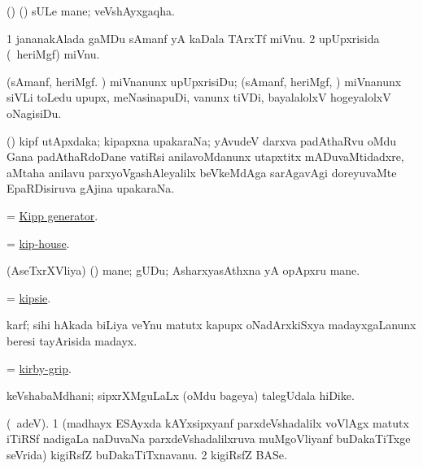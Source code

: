 \bentry
{}
\gl{\nA}
\bmng
(\birx) (\ashi) sULe mane; veVshAyxgaqha. 
\emng
\eentry

\bentry
{}
\gl{\nA}
\bmng
\bnum
\num{1} jananakAlada gaMDu sAmanf yA kaDala TArxTf miVnu. 
\num{2} upUpxrisida (\kanmu\ heriMgf) miVnu. 
\enum
\emng
\eentry

\bentry
{}
\gl{\sakirx}
\bmng
(sAmanf, heriMgf. \mo) miVnanunx upUpxrisiDu; (sAmanf, heriMgf, \mo) miVnanunx siVLi toLedu upupx, meNasinapuDi, \mo vanunx tiVDi, bayalalolxV hogeyalolxV oNagisiDu. 
\emng
\eentry


\bentry
{}
\gl{\nA}
\bmng
(\ravi) kipf utApxdaka; kipapxna upakaraNa; yAvudeV darxva padAthaRvu oMdu Gana padAthaRdoDane vatiRsi anilavoMdanunx utapxtitx mADuvaMtidadxre, aMtaha anilavu parxyoVgashAleyalilx beVkeMdAga sarAgavAgi doreyuvaMte EpaRDisiruva gAjina upakaraNa.  
\emng
\eentry

\bentry
{}
\gl{\nA}
\bmng
 = \hyperlink{Kipp generator}{Kipp generator}. 
\emng
\eentry

\bentry
{}
\gl{\nA}
\bmng
 = \hyperlink{kip-house}{kip-house}. 
\emng
\eentry

\bentry
{}
\gl{\nA}
\bmng
(AseTxrXVliya) (\ashi) mane; gUDu; AsharxyasAthxna yA opApxru mane. 
\emng
\eentry

\bentry
{}
\gl{\nA}
\bmng
 = \hyperlink{Kipsie}{kipsie}. 
\emng
\eentry

\bentry
{}
\gl{\nA}
\bmng
karf; sihi hAkada biLiya veYnu matutx kapupx oNadArxkiSxya madayxgaLanunx beresi tayArisida madayx. 
\emng
\eentry

\bentry
{}
\gl{\nA}
\expl{\P}
\bmng
 = \hyperlink{kirby-grip}{kirby-grip}. 
\emng
\eentry

\bentry
{}
\gl{\nA}
\bmng
keVshabaMdhani; sipxrXMguLaLx (oMdu bageya) talegUdala hiDike. 
\emng
\eentry

\bentry
{}
\gl{\nA}
\bmng
(\bava\ adeV). 
\bnum
\num{1} (madhayx ESAyxda kAYxsipxyanf parxdeVshadalilx voVlAgx matutx iTiRSf nadigaLa naDuvaNa parxdeVshadalilxruva muMgoVliyanf buDakaTiTxge seVrida) kigiRsfZ buDakaTiTxnavanu. 
\num{2} kigiRsfZ BASe. 
\enum
\emng
\eentry

